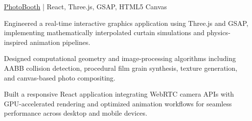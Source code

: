 \begin{cvproject}{\href{https://github.com/grvsnh/photobooth}{PhotoBooth} | React, Three.js, GSAP, HTML5 Canvas}{}
    \item Engineered a real-time interactive graphics application using Three.js and GSAP, implementing mathematically interpolated curtain simulations and physics-inspired animation pipelines.
    \item Designed computational geometry and image-processing algorithms including AABB collision detection, procedural film grain synthesis, texture generation, and canvas-based photo compositing.
    \item Built a responsive React application integrating WebRTC camera APIs with GPU-accelerated rendering and optimized animation workflows for seamless performance across desktop and mobile devices.
\end{cvproject}